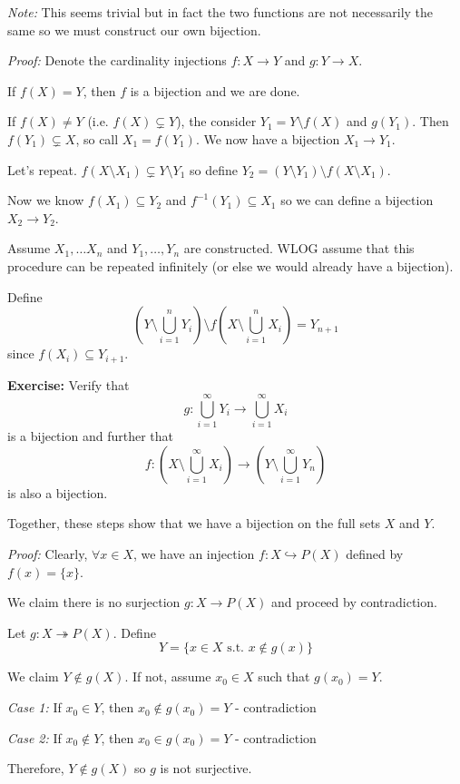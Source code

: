 \documentclass[12pt]{article}
\newcommand{\sub}{\subseteq}
\newcommand{\st}{\text{ s.t. }}
\newcommand{\card}{\text{card }}
\newcommand{\inj}{\hookrightarrow}
\newenvironment*{tbox}[2][gray]{
    \begin{tcolorbox}[
        parbox=false,
        colback=#1!5!white,
        colframe=#1!75!black,
        breakable,
        title={#2}
    ]}
    {\end{tcolorbox}}
\newenvironment*{exercise}[1][red]{
    \begin{tcolorbox}[
        parbox=false,
        colback=#1!5!white,
        colframe=#1!75!black,
        breakable
    ]}
    {\end{tcolorbox}}
\begin{document}
    \begin{tbox}{\textbf{Schröder-Bernstein Theorem:} If $\card X \leq \card Y$ and $\card Y \leq \card X$, then $\card X = \card Y$}
        \emph{Note:} This seems trivial but in fact the two functions are not necessarily the same so we must construct our own bijection. 

        \emph{Proof:} Denote the cardinality injections $f: X \to Y$ and $g: Y \to X$.

        If $f(X) = Y$, then $f$ is a bijection and we are done.

        If $f(X) \neq Y$ (i.e. $f(X) \subsetneq Y$), the consider $Y_1 = Y \setminus f(X)$ and $g(Y_1)$. Then $f(Y_1) \subsetneq X$, so call $X_1 = f(Y_1)$. We now have a bijection $X_1 \to Y_1$. 

        Let's repeat. $f(X \setminus X_1) \subsetneq Y \setminus Y_1$ so define $Y_2 = (Y \setminus Y_1) \setminus f(X \setminus X_1)$.

        Now we know $f(X_1) \sub Y_2$ and $f^{-1}(Y_1) \sub X_1$ so we can define a bijection $X_2 \to Y_2$.

        Assume $X_1, \dots X_n$ and $Y_1, \dots, Y_n$ are constructed. WLOG assume that this procedure can be repeated infinitely (or else we would already have a bijection). 

        Define 
        \[\left(Y \setminus \bigcup_{i=1}^n Y_i\right) \setminus f\left(X \setminus \bigcup_{i=1}^n X_i\right) = Y_{n+1}\]
        since $f(X_i) \sub Y_{i+1}$. 

        \begin{exercise}
            \textbf{Exercise:} Verify that 
            \[g: \bigcup_{i=1}^{\infty} Y_i \to \bigcup_{i=1}^{\infty} X_i\]
            is a bijection and further that 
            \[f: \left(X \setminus \bigcup_{i=1}^{\infty} X_i\right) \to \left(Y \setminus \bigcup_{i=1}^{\infty} Y_n\right)\] 
            is also a bijection.
        \end{exercise} 

        Together, these steps show that we have a bijection on the full sets $X$ and $Y$.
    \end{tbox}

    \begin{tbox}{\textbf{Proposition}: For any set $X$, $\card X < \card P(X)$}
        \emph{Proof:} Clearly, $\forall x \in X$, we have an injection $f: X \inj P(X)$ defined by $f(x) = \{x\}$.

        We claim there is no surjection $g: X \to P(X)$ and proceed by contradiction. 

        Let $g: X \twoheadrightarrow P(X)$. Define 
        \[Y = \{x \in X \st x \notin g(x)\}\] 

        We claim $Y \notin g(X)$. If not, assume $x_0 \in X$ such that $g(x_0) = Y$. 

        \emph{Case 1:} If $x_0 \in Y$, then $x_0 \notin g(x_0) = Y$ - contradiction 

        \emph{Case 2:} If $x_0 \notin Y$, then $x_0 \in g(x_0) = Y$ - contradiction

        Therefore, $Y \notin g(X)$ so $g$ is not surjective.
    \end{tbox}
\end{document}
